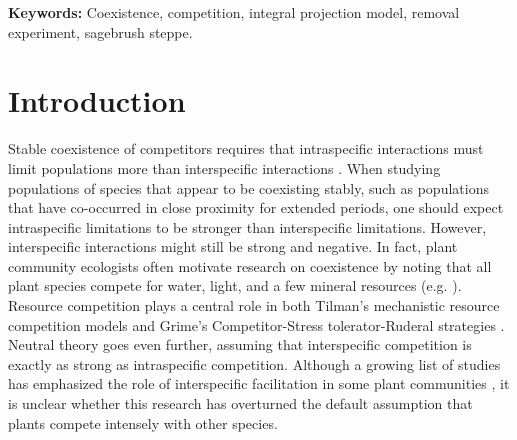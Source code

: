 \documentclass[11pt]{article}
\begin{document}
\begin{doublespacing}

\textbf{\large{Keywords:}} Coexistence, competition, integral projection model, removal experiment, sagebrush steppe. 

\section*{Introduction}

Stable coexistence of competitors requires that intraspecific interactions must limit populations more than interspecific interactions \citep{chesson_mechanisms_2000}. When studying populations of species that appear to be coexisting stably, such as populations that have co-occurred in close proximity for extended periods, one should expect intraspecific limitations to be stronger than interspecific limitations. However, interspecific interactions might still be strong and negative. In fact, plant community ecologists often motivate research on coexistence by noting that all plant species compete for water, light, and a few mineral resources (e.g. \citealt{silvertown_plant_2004}). Resource competition plays a central role in both Tilman's mechanistic resource competition models \citep{tilman_resource_1982} and Grime's Competitor-Stress tolerator-Ruderal strategies \citep{grime_plant_1979}. Neutral theory \citep{hubbell_unified_2001} goes even further, assuming that interspecific competition is exactly as strong as intraspecific competition. Although a growing list of studies has emphasized the role of interspecific facilitation in some plant communities \citep{brooker_facilitation_2008,he_global_2013}, it is unclear whether this research has overturned the default assumption that plants compete intensely with other species.


\end{doublespacing}
\end{document}
